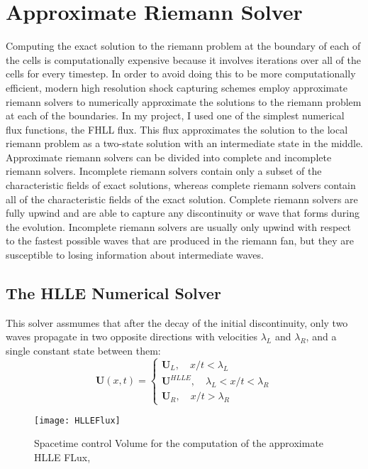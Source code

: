 \section{Approximate Riemann Solver}
Computing the exact solution to the riemann problem at the boundary of each of the cells is computationally expensive because it involves iterations over all of the cells for every timestep. In order to avoid doing this to be more computationally efficient, modern high resolution shock capturing schemes employ approximate riemann solvers to numerically approximate the solutions to the riemann problem at each of the boundaries. In my project, I used one of the simplest numerical flux functions, the FHLL flux. This flux approximates the solution to the local riemann problem as a two-state solution with an intermediate state in the middle. 
Approximate riemann solvers can be divided into complete and incomplete riemann solvers. Incomplete riemann solvers contain only a subset of the characteristic fields of exact solutions, whereas complete riemann solvers contain all of the characteristic fields of the exact solution. Complete riemann solvers are fully upwind and are able to capture any discontinuity or wave that forms during the evolution. Incomplete riemann solvers are usually only upwind with respect to the fastest possible waves that are produced in the riemann fan, but they are susceptible to losing information about intermediate waves. 
\subsection{The HLLE Numerical Solver}
This solver assmumes that after the decay of the initial discontinuity, only two waves propagate in two opposite directions with velocities $\lambda_L$ and $\lambda_R$, and a single constant state between them:
$$\bm{U}(x,t)=\begin{cases}
		\bm{U}_L , \quad x/t < \lambda_L \\
		\bm{U}^{HLLE} , \quad \lambda_L < x/t < \lambda_R \\
		\bm{U}_R , \quad x/t > \lambda_R
\end{cases}$$

\begin{figure}[h]
		\centering
		\texttt{[image: HLLEFlux]}
        \caption{Spacetime control Volume for the computation of the approximate HLLE FLux, \cite{rezzolla}}
\end{figure}


